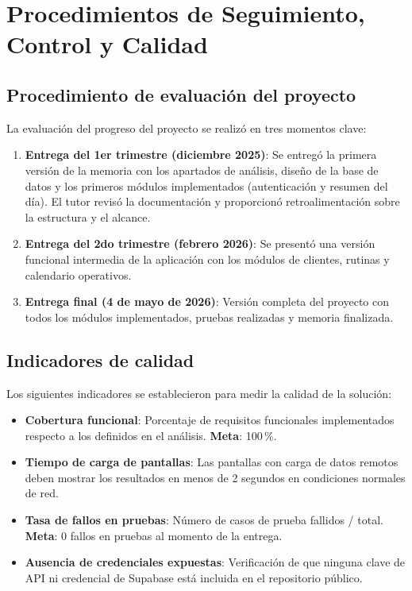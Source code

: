 \chapter{Procedimientos de Seguimiento, Control y Calidad}

\section{Procedimiento de evaluación del proyecto}

La evaluación del progreso del proyecto se realizó en tres momentos clave:

\begin{enumerate}
  \item \textbf{Entrega del 1er trimestre (diciembre 2025)}: Se entregó la primera versión de la memoria con los apartados de análisis, diseño de la base de datos y los primeros módulos implementados (autenticación y resumen del día). El tutor revisó la documentación y proporcionó retroalimentación sobre la estructura y el alcance.
  \item \textbf{Entrega del 2do trimestre (febrero 2026)}: Se presentó una versión funcional intermedia de la aplicación con los módulos de clientes, rutinas y calendario operativos.
  \item \textbf{Entrega final (4 de mayo de 2026)}: Versión completa del proyecto con todos los módulos implementados, pruebas realizadas y memoria finalizada.
\end{enumerate}

\section{Indicadores de calidad}

Los siguientes indicadores se establecieron para medir la calidad de la solución:

\begin{itemize}
  \item \textbf{Cobertura funcional}: Porcentaje de requisitos funcionales implementados respecto a los definidos en el análisis. \textbf{Meta}: 100\,\%.
  \item \textbf{Tiempo de carga de pantallas}: Las pantallas con carga de datos remotos deben mostrar los resultados en menos de 2 segundos en condiciones normales de red.
  \item \textbf{Tasa de fallos en pruebas}: Número de casos de prueba fallidos / total. \textbf{Meta}: 0 fallos en pruebas al momento de la entrega.
  \item \textbf{Ausencia de credenciales expuestas}: Verificación de que ninguna clave de API ni credencial de Supabase está incluida en el repositorio público.
\end{itemize}

